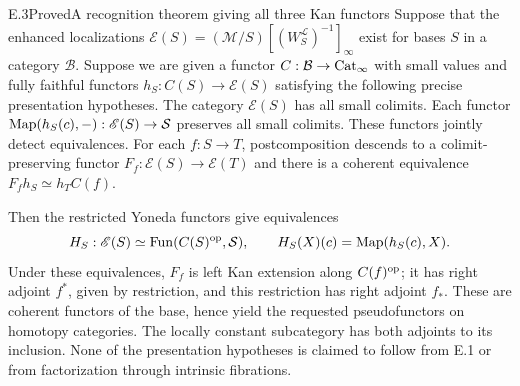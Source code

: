 \begin{claim}{E.3}{Proved}{A recognition theorem giving all three Kan functors}
Suppose that the enhanced localizations
$\mathscr E(S)=(\mathcal M/S)[(W_S^{\mathcal L})^{-1}]_\infty$
exist for bases $S$ in a category $\mathcal B$. Suppose we are given a functor $C:\mathcal B\to\mathrm{Cat}_\infty$ with small values and fully faithful functors $h_S:C(S)\to\mathscr E(S)$ satisfying the following precise presentation hypotheses. The category $\mathscr E(S)$ has all small colimits. Each functor $\mathrm{Map}(h_S(c),-):\mathscr E(S)\to\mathcal S$ preserves all small colimits. These functors jointly detect equivalences. For each $f:S\to T$, postcomposition descends to a colimit-preserving functor $F_f:\mathscr E(S)\to\mathscr E(T)$ and there is a coherent equivalence $F_fh_S\simeq h_TC(f)$.

Then the restricted Yoneda functors give equivalences
\[
 H_S:\mathscr E(S)\simeq\mathrm{Fun}(C(S)^{\mathrm{op}},\mathcal S),\qquad
 H_S(X)(c)=\mathrm{Map}(h_S(c),X).
\]
Under these equivalences, $F_f$ is left Kan extension along $C(f)^{\mathrm{op}}$; it has right adjoint $f^*$, given by restriction, and this restriction has right adjoint $f_*$. These are coherent functors of the base, hence yield the requested pseudofunctors on homotopy categories. The locally constant subcategory has both adjoints to its inclusion. None of the presentation hypotheses is claimed to follow from E.1 or from factorization through intrinsic fibrations.
\end{claim}
